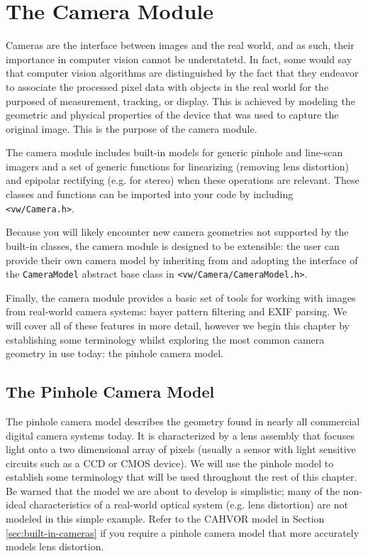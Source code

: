 \chapter{The Camera Module}

Cameras are the interface between images and the real world, and as
such, their importance in computer vision cannot be understatetd.  In
fact, some would say that computer vision algorithms are distinguished
by the fact that they endeavor to associate the processed pixel data
with objects in the real world for the purposed of measurement,
tracking, or display.  This is achieved by modeling the geometric and
physical properties of the device that was used to capture the
original image.  This is the purpose of the camera module.

The camera module includes built-in models for generic pinhole and
line-scan imagers and a set of generic functions for linearizing
(removing lens distortion) and epipolar rectifying (e.g. for stereo)
when these operations are relevant.  These classes and functions can
be imported into your code by including {\tt <vw/Camera.h>}.

Because you will likely encounter new camera geometries not supported
by the built-in classes, the camera module is designed to be
extensible: the user can provide their own camera model by inheriting
from and adopting the interface of the {\tt CameraModel} abstract base
class in {\tt <vw/Camera/CameraModel.h>}.

Finally, the camera module provides a basic set of tools for working
with images from real-world camera systems: bayer pattern filtering
and EXIF parsing.  We will cover all of these features in more detail,
however we begin this chapter by establishing some terminology whilst
exploring the most common camera geometry in use today: the pinhole
camera model.

\section{The Pinhole Camera Model}
The pinhole camera model describes the geometry found in nearly all
commercial digital camera systems today.  It is characterized by a
lens assembly that focuses light onto a two dimensional array of
pixels (usually a sensor with light sensitive circuits such as a CCD
or CMOS device).  We will use the pinhole model to establish some
terminology that will be used throughout the rest of this chapter.  Be
warned that the model we are about to develop is simplistic; many of
the non-ideal characteristics of a real-world optical system
(e.g. lens distortion) are not modeled in this simple example.  Refer
to the CAHVOR model in Section \ref{sec:built-in-cameras} if you
require a pinhole camera model that more accurately models lens
distortion.

